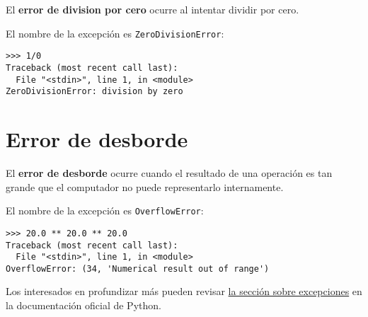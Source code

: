 El \textbf{error de division por cero} ocurre al intentar dividir por
cero.

El nombre de la excepción es \lstinline!ZeroDivisionError!:

\begin{lstlisting}
>>> 1/0
Traceback (most recent call last):
  File "<stdin>", line 1, in <module>
ZeroDivisionError: division by zero
\end{lstlisting}

\section{Error de desborde}

El \textbf{error de desborde} ocurre cuando el resultado de una
operación es tan grande que el computador no puede representarlo
internamente.

El nombre de la excepción es \lstinline!OverflowError!:

\begin{lstlisting}
>>> 20.0 ** 20.0 ** 20.0
Traceback (most recent call last):
  File "<stdin>", line 1, in <module>
OverflowError: (34, 'Numerical result out of range')
\end{lstlisting}

Los interesados en profundizar más pueden revisar
\href{http://docs.python.org/library/exceptions.html}{la sección sobre
excepciones} en la documentación oficial de Python.
